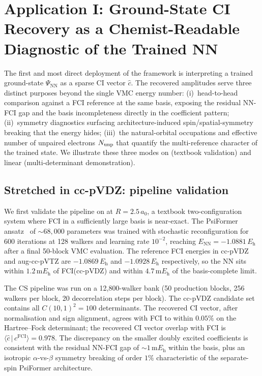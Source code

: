 \documentclass[journal=jctcce,manuscript=article,layout=traditional]{achemso}
\begin{document}
\section{Application I: Ground-State CI Recovery as a Chemist-Readable
         Diagnostic of the Trained NN}
\label{sec:validation}

The first and most direct deployment of the framework is interpreting
a trained ground-state $\Psi_{\mathrm{NN}}$ as a sparse CI vector
$\widehat c$. The recovered amplitudes serve three distinct purposes
beyond the single VMC energy number: (i)~head-to-head comparison
against a FCI reference at the same basis, exposing the residual
NN-FCI gap and the basis incompleteness directly in the
coefficient pattern; (ii)~symmetry diagnostics surfacing
architecture-induced spin/spatial-symmetry breaking that the energy
hides; (iii)~the natural-orbital occupations and effective number of
unpaired electrons $N_{\rm unp}$ that quantify the multi-reference
character of the trained state. We illustrate these three modes on
 (textbook validation) and linear  (multi-determinant
demonstration).

\subsection{Stretched  in cc-pVDZ: pipeline validation}
\label{sec:h2}

We first validate the pipeline on  at $R = 2.5\,a_0$, a textbook
two-configuration system where FCI in a sufficiently large basis is
near-exact. The PsiFormer ansatz~\cite{vonGlehn2023PsiFormer} of
$\sim 68{,}000$ parameters was trained with stochastic reconfiguration
for 600 iterations at 128 walkers and learning rate $10^{-2}$, reaching
$E_{\mathrm{NN}} = -1.0881\,E_{\mathrm{h}}$ after a final 50-block VMC
evaluation. The reference FCI energies in cc-pVDZ and aug-cc-pVTZ are
$-1.0869\,E_{\mathrm{h}}$ and $-1.0928\,E_{\mathrm{h}}$ respectively, so
the NN sits within $1.2\,\mathrm{m}E_{\mathrm{h}}$ of FCI(cc-pVDZ) and
within $4.7\,\mathrm{m}E_{\mathrm{h}}$ of the basis-complete limit.

The CS pipeline was run on a 12{,}800-walker bank (50 production blocks,
256 walkers per block, 20 decorrelation steps per block). The cc-pVDZ
candidate set contains all $C(10, 1)^2 = 100$ determinants. The
recovered CI vector, after normalisation and sign alignment, agrees
with FCI to within $0.05\%$ on the Hartree--Fock determinant; the
recovered CI vector overlap with FCI is
$\langle \widehat{c}\,|\,c^{\mathrm{FCI}} \rangle = 0.978$. The
discrepancy on the smaller doubly excited coefficients is consistent
with the residual NN-FCI gap of $\sim 1\,\mathrm{m}E_{\mathrm{h}}$
within the basis, plus an isotropic $\alpha$-vs-$\beta$ symmetry
breaking of order $1\%$ characteristic of the separate-spin
PsiFormer architecture.
\end{document}
